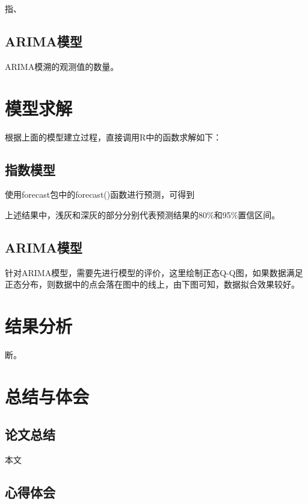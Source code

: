 \documentclass[10pt]{ctexart}
\begin{document}
		指、
		
		
	\subsection{ARIMA模型}
		
		ARIMA模溯的观测值的数量。
		
	
\section{模型求解}
	
	根据上面的模型建立过程，直接调用R中的函数求解如下：
	
	\subsection{指数模型}
	
	使用forecast包中的forecast()函数进行预测，可得到
	
	
	
	上述结果中，浅灰和深灰的部分分别代表预测结果的80\%和95\%置信区间。
	
	\subsection{ARIMA模型}
	
		针对ARIMA模型，需要先进行模型的评价，这里绘制正态Q-Q图，如果数据满足正态分布，则数据中的点会落在图中的线上，由下图可知，数据拟合效果较好。
		
		
		

		
\section{结果分析}
	
	断。
	
	
\section{总结与体会}
	
	\subsection{论文总结}
	
	本文
	
	\subsection{心得体会}
	
\end{document}

